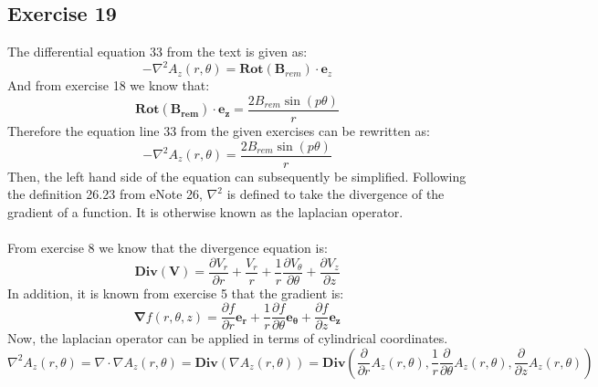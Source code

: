 \documentclass{article}
\begin{document}
\subsection{Exercise 19}
The differential equation 33 from the text is given as:
\begin{equation}
    -\nabla ^{2} A_{z}\left(r,\theta\right)= \mathbf{Rot}\mathbf{\left(B_{\mathit{rem}} \right)\cdot}\mathbf{e}_z
\end{equation}
And from exercise 18 we know that:
\begin{equation}
    \mathbf{Rot(B_{rem})} \cdot \mathbf{e_z} = \frac{2B_{\mathit{rem}}\sin\left(p\mathit{\theta}\right)}{r}
\end{equation}
Therefore the equation line 33 from the given exercises can be rewritten as:
\begin{equation}
    -\nabla ^{2} A_{z}\left(r,\theta\right) = \frac{2B_{\mathit{rem}}\sin\left(p\mathit{\theta}\right)}{r}
\end{equation}
Then, the left hand side of the equation can subsequently be simplified. Following the definition 26.23 from eNote 26, $\nabla ^2$ is defined to take the divergence of the gradient of a function. It is otherwise known as the laplacian operator.
\\
\\
From exercise 8 we know that the divergence equation is:
\begin{equation}
    \mathbf{Div(V)} = \frac{\partial V_{r}}{\partial r}+\frac{V_{r}}{r}+\frac{1}{r}\frac{\partial V_{\theta}}{\partial \theta}+\frac{\partial V_{z}}{\partial z}
\end{equation}
 In addition, it is known from exercise 5 that the gradient is:
 \begin{equation}
     \mathbf{\nabla} f\left(r,\theta,z\right) = \frac{\partial f}{\partial r}\mathbf{e_{r}} + \frac{1}{r}\frac{\partial f}{\partial \theta} \mathbf{e_{\theta}}+\frac{\partial f}{\partial z} \mathbf{e_{z}}
 \end{equation}
Now, the laplacian operator can be applied in terms of cylindrical coordinates.
\begin{equation}
    \nabla ^{2} A_{z}\left(r,\theta\right)=\nabla \cdot \nabla A_{z}\left(r,\theta\right)= \mathbf{Div}\left(\nabla A_{z}\left(r,\theta\right)\right) = 
    \mathbf{Div}\left(\frac{\partial}{\partial r} A_{z}\left(r,\theta\right),\frac{1}{r}\frac{\partial}{\partial \theta} A_{z}\left(r,\theta\right),\frac{\partial}{\partial z}A_{z}\left(r,\theta\right)\right)
\end{equation}
\end{document}
